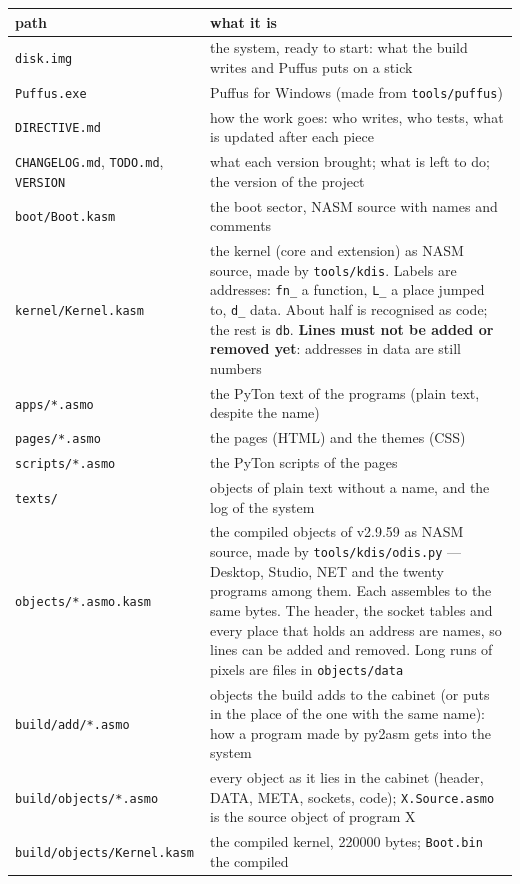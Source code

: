 \documentclass[11pt,a4paper]{article}
\newcommand{\file}[1]{\texttt{#1}}
\begin{document}
\begin{longtable}{@{}p{4.6cm} p{10.4cm}@{}}
\toprule
path & what it is \\ \midrule
\file{disk.img} & the system, ready to start: what the build writes and Puffus puts on a stick \\
\file{Puffus.exe} & Puffus for Windows (made from \file{tools/puffus}) \\
\file{DIRECTIVE.md} & how the work goes: who writes, who tests, what is updated after each piece \\
\file{CHANGELOG.md}, \file{TODO.md}, \file{VERSION} & what each version brought; what is left to do;
      the version of the project \\
\midrule
\file{boot/Boot.kasm} & the boot sector, NASM source with names and comments \\
\file{kernel/Kernel.kasm} & the kernel (core and extension) as NASM source, made by
      \file{tools/kdis}. Labels are addresses: \texttt{fn\_} a function, \texttt{L\_} a place
      jumped to, \texttt{d\_} data. About half is recognised as code; the rest is \texttt{db}.
      \textbf{Lines must not be added or removed yet}: addresses in data are still numbers \\
\file{apps/*.asmo} & the PyTon text of the programs (plain text, despite the name) \\
\file{pages/*.asmo} & the pages (HTML) and the themes (CSS) \\
\file{scripts/*.asmo} & the PyTon scripts of the pages \\
\file{texts/} & objects of plain text without a name, and the log of the system \\
\midrule
\file{objects/*.asmo.kasm} & the compiled objects of v2.9.59 as NASM source, made by
      \file{tools/kdis/odis.py} --- Desktop, Studio, NET and the twenty programs among them. Each
      assembles to the same bytes. The header, the socket tables and every place that holds an
      address are names, so lines can be added and removed. Long runs of pixels are files in
      \file{objects/data} \\
\file{build/add/*.asmo} & objects the build adds to the cabinet (or puts in the place of the one
      with the same name): how a program made by py2asm gets into the system \\
\file{build/objects/*.asmo} & every object as it lies in the cabinet (header, DATA, META, sockets,
      code); \file{X.Source.asmo} is the source object of program X \\
\file{build/objects/Kernel.kasm} & the compiled kernel, 220000 bytes; \file{Boot.bin} the compiled

\end{longtable}
\end{document}
